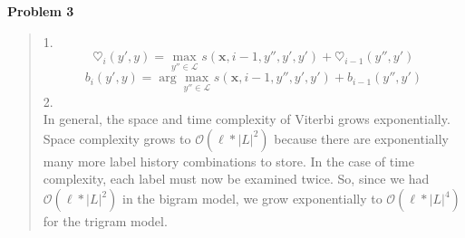 {\bf Problem 3}

\begin{quote}
    1. 
	$$ \heartsuit_i (y', y) = \max_{y'' \in \mathcal{L}} s(\textbf{x}, i-1, y'', y', y') + \heartsuit_{i-1} (y'', y') $$
	$$ b_i (y', y) = \arg\!\max_{y'' \in \mathcal{L}} s(\textbf{x}, i-1, y'', y', y') + b_{i-1} (y'', y') $$
    2.\\ 
    
In general, the space and time complexity of Viterbi grows exponentially. Space complexity grows to $\mathcal{O}(\ell * | L |^2)$ because there are exponentially many more label history combinations to store. In the case of time complexity, each label must now be examined twice. So, since we had $\mathcal{O} (\ell * | L |^2)$ in the bigram model, we grow exponentially to $\mathcal{O} (\ell * | L |^4)$ for the trigram model. 

\end{quote}
